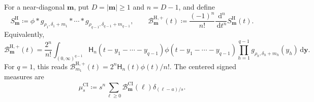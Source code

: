 \documentclass[10pt]{amsart}
\newcommand{\dd}{\,\mathrm d}
\newcommand{\mm}{\boldsymbol m}
\newcommand{\abs}[1]{\lvert#1\rvert}
\theoremstyle{plain}
\theoremstyle{definition}
\theoremstyle{remark}
\begin{document}
For a near-diagonal \(\mm\), put \(D=\abs\mm\ge1\) and \(n=D-1\), and
define
\begin{equation}
 S_{\mm}^{\mathrm H}
 \coloneq\phi*g_{\rho_1,\delta_1+m_1}*\cdots *
 g_{\rho_{q-1},\delta_{q-1}+m_{q-1}},
 \qquad
 \mathcal B_{\mm}^{\mathrm H,+}(t)
 \coloneq\frac{(-1)^n}{n!}\frac{\dd^n}{\dd t^n}S_{\mm}^{\mathrm H}(t).
 \label{eq:Hermite-seed-B}
\end{equation}
Equivalently,
\begin{equation}
 \mathcal B_{\mm}^{\mathrm H,+}(t)
 =\frac{2^n}{n!}
 \int_{(0,\infty)^{q-1}}
 \mathsf H_n(t-y_1-\cdots-y_{q-1})
 \phi(t-y_1-\cdots-y_{q-1})
 \prod_{h=1}^{q-1}g_{\rho_h,\delta_h+m_h}(y_h)
 \dd\boldsymbol y.
 \label{eq:Hermite-B-kernel-plus}
\end{equation}
For \(q=1\), this reads
\(\mathcal B_{m_1}^{\mathrm H,+}(t)
=2^n\mathsf H_n(t)\phi(t)/n!\).
The centered signed measures are
\begin{equation}
 \mu_s^{\mathrm{CI}}
 \coloneq s^n\sum_{\ell\ge0}\mathcal B_{\mm}^{\mathrm{CI}}(\ell)
 \delta_{(\ell-a)/s}.
 \label{eq:Hermite-B-measures}
\end{equation}
\end{document}
